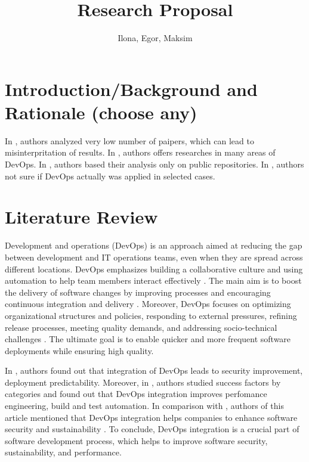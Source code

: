 \documentclass[oneside,final,12pt,a4paper]{extreport}
\title{Research Proposal}
\author{Ilona, Egor, Maksim}
\affil{Innopolis University}
\begin{document}
\maketitle

\newpage


\section{Introduction/Background and Rationale (choose any)}

In \cite{8}, authors analyzed very low number of paipers, which can lead to misinterpritation of results. In \cite{11}, authors offers researches in many areas of DevOps. In \cite{20}, authors based their analysis only on public repositories. In \cite{21}, authors not sure if DevOps actually was applied in selected cases.

\section{Literature Review}

Development and operations (DevOps) is an approach aimed at reducing the gap between development and IT operations teams, even when they are spread across different locations. DevOps emphasizes building a collaborative culture and using automation to help team members interact effectively \cite{7}. The main aim is to boost the delivery of software changes by improving processes and encouraging continuous integration and delivery \cite{11}. Moreover, DevOps focuses on optimizing organizational structures and policies, responding to external pressures, refining release processes, meeting quality demands, and addressing socio-technical challenges \cite{7}. The ultimate goal is to enable quicker and more frequent software deployments while ensuring high quality.

In \cite{7}, authors found out that integration of DevOps leads to security improvement, deployment predictability. Moreover, in \cite{9}, authors studied success factors by categories and found out that DevOps integration improves perfomance engineering, build and test automation. In comparison with \cite{9}, authors of this article mentioned that DevOps integration helps companies to enhance software security and sustainability \cite{12}\cite{18}. To conclude, DevOps integration is a crucial part of software development process, which helps to improve software security, sustainability, and performance.
\end{document}
